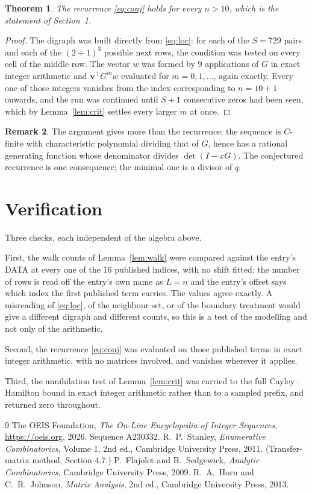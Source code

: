 \documentclass[11pt,a4paper]{article}
\theoremstyle{plain}
\newtheorem{theorem}{Theorem}
\theoremstyle{definition}
\newtheorem{remark}[theorem]{Remark}
\begin{document}
\begin{theorem}
The recurrence \eqref{eq:conj} holds for every $n>10$, which is the statement of
Section~1.
\end{theorem}

\begin{proof}
The digraph was built directly from \eqref{eq:loc}: for each of the $S=729$ pairs and each
of the $(2+1)^{3}$ possible next rows, the condition was tested on every cell of
the middle row. The vector $w$ was formed by $9$ applications of $G$ in exact integer
arithmetic and $\mathbf{v}^{\!\top}G^{m}w$ evaluated for $m=0,1,\dots$, again exactly.
Every one of those integers vanishes from the index corresponding to $n=10+1$ onwards,
and the run was continued until $S+1$ consecutive zeros had been seen, which by
Lemma~\ref{lem:crit} settles every larger $m$ at once.
\end{proof}

\begin{remark}
The argument gives more than the recurrence: the sequence is $C$-finite with characteristic
polynomial dividing that of $G$, hence has a rational generating function whose denominator
divides $\det(I-xG)$. The conjectured recurrence is one consequence; the minimal one is a
divisor of $q$.
\end{remark}

\section{Verification}

Three checks, each independent of the algebra above.

First, the walk counts of Lemma~\ref{lem:walk} were compared against the entry's DATA at
every one of the $16$ published indices, with no shift fitted: the number of rows is
read off the entry's own name as $L=n$ and the entry's offset says which index the first
published term carries. The values agree exactly. A misreading of \eqref{eq:loc}, of the
neighbour set, or of the boundary treatment would give a different digraph and different
counts, so this is a test of the modelling and not only of the arithmetic.

Second, the recurrence \eqref{eq:conj} was evaluated on those published terms in exact
integer arithmetic, with no matrices involved, and vanishes wherever it applies.

Third, the annihilation test of Lemma~\ref{lem:crit} was carried to the full
Cayley--Hamilton bound in exact integer arithmetic rather than to a sampled prefix, and
returned zero throughout.

\begin{thebibliography}{9}
 The OEIS Foundation, \emph{The On-Line Encyclopedia of Integer
Sequences}, \url{https://oeis.org}, 2026. Sequence A230332.
 R.~P.~Stanley, \emph{Enumerative Combinatorics}, Volume 1, 2nd ed.,
Cambridge University Press, 2011. (Transfer-matrix method, Section 4.7.)
 P.~Flajolet and R.~Sedgewick, \emph{Analytic Combinatorics}, Cambridge
University Press, 2009.
 R.~A.~Horn and C.~R.~Johnson, \emph{Matrix Analysis}, 2nd ed., Cambridge
University Press, 2013.
\end{thebibliography}
\end{document}
